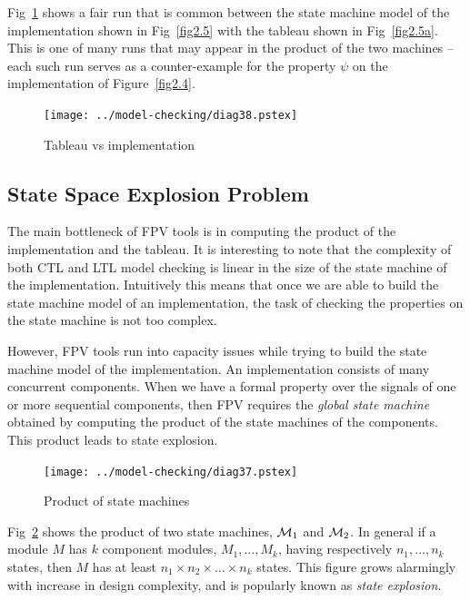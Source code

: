 \noindent
Fig~\ref{fig2.6} shows a fair run that is common between the state machine
model of the implementation shown in Fig~\ref{fig2.5} with the tableau shown
in Fig~\ref{fig2.5a}. This is one of many runs that may appear in the product
of the two machines -- each such run serves as a counter-example for the
property $\psi$ on the implementation of Figure~\ref{fig2.4}. 

\begin{figure}[htb]
\centering
\texttt{[image: ../model-checking/diag38.pstex]}
\center
\caption{Tableau vs implementation} \label{fig2.6}
\end{figure} 

\subsection{State Space Explosion Problem}
The main bottleneck of FPV tools is in computing the product of 
the implementation and the tableau. It is interesting to note that the 
complexity of both CTL and LTL model
checking is linear in the size of the state machine of the implementation.
Intuitively this means that once we are able to build the state machine model
of an implementation, the task of checking the properties on the state machine
is not too complex. 

\noindent
However, FPV tools run into capacity issues while trying to build the state 
machine model of the implementation. An implementation consists of many 
concurrent components. When we have a formal property 
over the signals of one or more sequential components,
then FPV requires the {\em global state machine} obtained by computing the
product of the state machines of the components. This product leads to
state explosion.

\begin{figure}[htb]
\centering
\texttt{[image: ../model-checking/diag37.pstex]}
\center
\caption{Product of state machines} \label{fig2.7}
\end{figure} 

\noindent
Fig~\ref{fig2.7} shows the product of two state machines, ${\cal M}_1$ and
${\cal M}_2$. In general if a module $M$ has $k$ component modules,
$M_1, \ldots, M_k$, having respectively $n_1, \ldots, n_k$ states, then
$M$ has at least $n_1 \times n_2 \times \ldots \times n_k$ states. This
figure grows alarmingly with increase in design complexity, and is popularly
known as {\em state explosion}.

